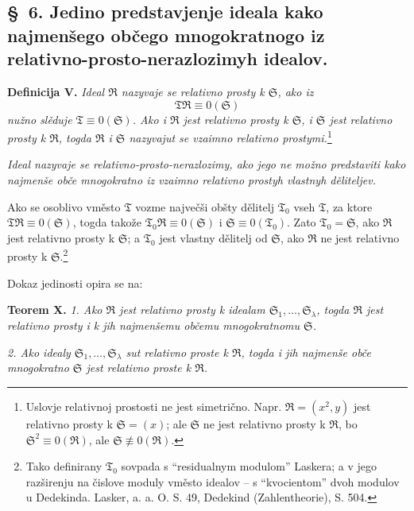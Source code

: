 \documentclass[11pt]{article}
\newcommand{\ideal}[1]{\mathfrak{#1}}
\begin{document}

\setcounter{footnote}{22}
\subsection*{\S~6. Jedino predstavjenje ideala kako najmenšego občego mnogokratnogo iz relativno-prosto-nerazlozimyh idealov.}

\textbf{Definicija V.} \emph{Ideal \(\ideal R\) nazyvaje se relativno prosty k \(\ideal S\), ako iz
\[
 \ideal T\ideal R\equiv0(\ideal S)
\]
nužno slěduje \(\ideal T\equiv0(\ideal S)\). Ako i \(\ideal R\) jest relativno prosty k \(\ideal S\), i \(\ideal S\) jest relativno prosty k \(\ideal R\), togda \(\ideal R\) i \(\ideal S\) nazyvajut se vzaimno relativno prostymi.}\footnote{Uslovje relativnoj prostosti ne jest simetrično. Napr. \(\ideal R=(x^2,y)\) jest relativno prosty k \(\ideal S=(x)\); ale \(\ideal S\) ne jest relativno prosty k \(\ideal R\), bo \(\ideal S^2\equiv0(\ideal R)\), ale \(\ideal S\not\equiv0(\ideal R)\).}

\emph{Ideal nazyvaje se relativno-prosto-nerazlozimy, ako jego ne možno predstaviti kako najmenše obče mnogokratno iz vzaimno relativno prostyh vlastnyh děliteljev.}

Ako se osoblivo vměsto \(\ideal T\) vozme največši obšty dělitelj \(\ideal T_0\) vseh \(\ideal T\), za ktore \(\ideal T\ideal R\equiv0(\ideal S)\), togda takože \(\ideal T_0\ideal R\equiv0(\ideal S)\) i \(\ideal S\equiv0(\ideal T_0)\). Zato \(\ideal T_0=\ideal S\), ako \(\ideal R\) jest relativno prosty k \(\ideal S\); a \(\ideal T_0\) jest vlastny dělitelj od \(\ideal S\), ako \(\ideal R\) ne jest relativno prosty k \(\ideal S\).\footnote{Tako definirany \(\ideal T_0\) sovpada s ``residualnym modulom'' Laskera; a v jego razširenju na čislove moduly vměsto idealov -- s ``kvocientom'' dvoh modulov u Dedekinda. Lasker, a. a. O. S. 49, Dedekind (Zahlentheorie), S. 504.}

Dokaz jedinosti opira se na:

\textbf{Teorem X.} \emph{1. Ako \(\ideal R\) jest relativno prosty k idealam \(\ideal S_1,\ldots,\ideal S_\lambda\), togda \(\ideal R\) jest relativno prosty i k jih najmenšemu občemu mnogokratnomu \(\ideal S\).}

\emph{2. Ako idealy \(\ideal S_1,\ldots,\ideal S_\lambda\) sut relativno proste k \(\ideal R\), togda i jih najmenše obče mnogokratno \(\ideal S\) jest relativno proste k \(\ideal R\).}
\end{document}
